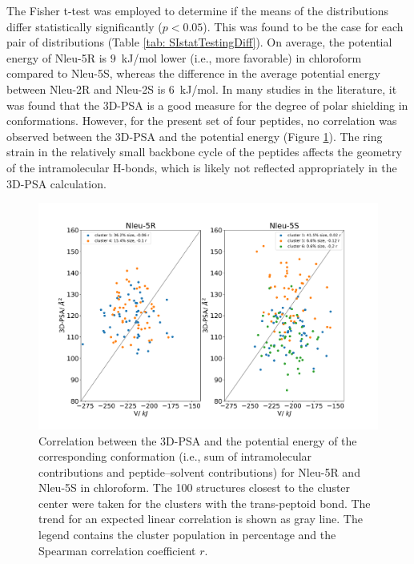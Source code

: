 The Fisher t-test \cite{Kotz1998} was employed to determine if the means of the distributions differ statistically significantly ($p < 0.05$). 
This was found to be the case for each pair of distributions (Table \ref{tab: SIstatTestingDiff}). 
On average, the potential energy of Nleu-5R is $9$~kJ/mol lower (i.e., more favorable) in chloroform compared to Nleu-5S, whereas the difference in the average potential energy between Nleu-2R and Nleu-2S is $6$~kJ/mol. In many studies in the literature, it was found that the 3D-PSA is a good measure for the degree of polar shielding in conformations. \cite{Roux2020, Sebastiano2018, Vorherr2018, Peraro2018} 
However, for the present set of four peptides, no correlation was observed between the 3D-PSA and the potential energy (Figure \ref{fig: SI3DPSAANA}). 
The ring strain in the relatively small backbone cycle of the peptides affects the geometry of the intramolecular H-bonds, which is likely not reflected appropriately in the 3D-PSA calculation. 
\begin{figure}[h!]
    \centering
    \includegraphics[width=\textwidth]{7_chapter_5/fig/results/3dPSA.png}
    \caption{Correlation between the 3D-PSA and the potential energy of the corresponding conformation (i.e., sum of intramolecular contributions and peptide–solvent contributions) for Nleu-5R and Nleu-5S in chloroform. The 100 structures closest to the cluster center were taken for the clusters with the trans-peptoid bond. The trend for an expected linear correlation is shown as gray line. The legend contains the cluster population in percentage and the Spearman correlation coefficient $r$.}
    \label{fig: SI3DPSAANA}
\end{figure}

